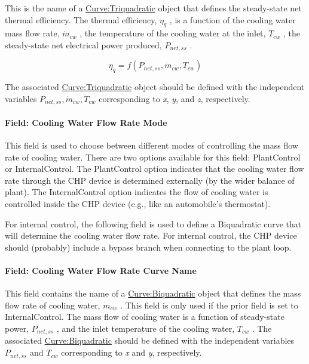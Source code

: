 This is the name of a \hyperref[curvetriquadratic]{Curve:Triquadratic} object that defines the steady-state net thermal efficiency. The thermal efficiency, \(\eta_q\) , is a function of the cooling water mass flow rate, \(\dot m_{cw}\) , the temperature of the cooling water at the inlet, \(T_{cw}\) , the steady-state net electrical power produced, \(P_{net,ss}\) .

\begin{equation}
{\eta_q} = f\left( {{P_{net,ss}},{{\dot m}_{cw}},{T_{cw}}} \right)
\end{equation}

The associated \hyperref[curvetriquadratic]{Curve:Triquadratic} object should be defined with the independent variables \({P_{net,ss}},{\dot m_{cw}},{T_{cw}}\) corresponding to \emph{x}, \emph{y}, and \emph{z}, respectively.

\paragraph{Field: Cooling Water Flow Rate Mode}\label{field-cooling-water-flow-rate-mode}

This field is used to choose between different modes of controlling the mass flow rate of cooling water. There are two options available for this field: PlantControl or InternalControl. The PlantControl option indicates that the cooling water flow rate through the CHP device is determined externally (by the wider balance of plant). The InternalControl option indicates the flow of cooling water is controlled inside the CHP device (e.g., like an automobile's thermostat).

For internal control, the following field is used to define a Biquadratic curve that will determine the cooling water flow rate. For internal control, the CHP device should (probably) include a bypass branch when connecting to the plant loop.

\paragraph{Field: Cooling Water Flow Rate Curve Name}\label{field-cooling-water-flow-rate-curve-name}

This field contains the name of a \hyperref[curvebiquadratic]{Curve:Biquadratic} object that defines the mass flow rate of cooling water, \({\dot m_{cw}}\) . This field is only used if the prior field is set to InternalControl. The mass flow of cooling water is a function of steady-state power, \({P_{net,ss}}\) , and the inlet temperature of the cooling water, \({T_{cw}}\) . The associated \hyperref[curvebiquadratic]{Curve:Biquadratic} should be defined with the independent variables \({P_{net,ss}}\) and \({T_{cw}}\) corresponding to \emph{x} and \emph{y}, respectively.

